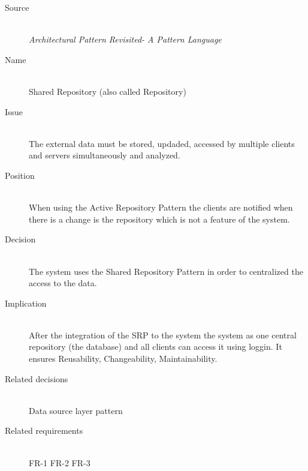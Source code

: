 \begin{description}
\item [Source]~\\
\textit{Architectural Pattern Revisited- A Pattern Language} \\

 \item [Name]~\\ Shared Repository (also called Repository) \\
 \item [Issue]~\\ The external data must be stored, updaded, accessed by multiple clients and servers simultaneously and analyzed.\\
 \item [Position]~\\ When using the Active Repository Pattern the clients are notified when there is a change is the repository which is not a feature of the system.\\
 \item [Decision]~\\ The system uses the Shared Repository Pattern in order to centralized the access to the data.\\
 \item [Implication]~\\ After the integration of the SRP to the system the system as one central repository (the database) and all clients can access it using loggin. It ensures Reusability, Changeability, Maintainability. \\
\item [Related decisions]~\\ Data source layer pattern \\
\item [Related requirements]~\\ FR-1 FR-2 FR-3 \\
 
 \end{description}



